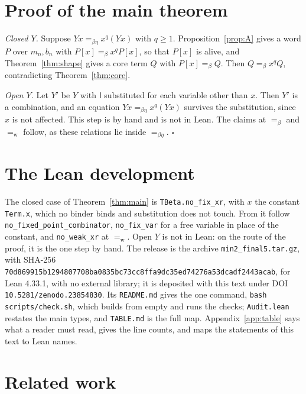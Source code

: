 \documentclass[a4paper,english]{lipics-v2021}
\newcommand{\I}{\mathsf{I}}
\newcommand{\eqw}{=_{\mathrm{w}}}
\newcommand{\eqb}{=_{\beta}}
\newcommand{\eqbe}{=_{\beta\eta}}
\newcommand{\lean}[1]{\texttt{#1}}
\begin{document}
\section{Proof of the main theorem}\label{sec:proof}

\emph{Closed $Y$.} Suppose $Yx \eqbe x^q(Yx)$ with $q \geq 1$. Proposition~\ref{prop:A} gives a word $P$ over $m_n,b_n$ with $P[x] \eqb x^qP[x]$, so that $P[x]$ is alive, and Theorem~\ref{thm:shape} gives a core term $Q$ with $P[x] \eqb Q$. Then $Q \eqb x^qQ$, contradicting Theorem~\ref{thm:core}.

\emph{Open $Y$.} Let $Y'$ be $Y$ with $\I$ substituted for each variable other than $x$. Then $Y'$ is a combination, and an equation $Yx \eqbe x^q(Yx)$ survives the substitution, since $x$ is not affected. This step is by hand and is not in Lean. The claims at $\eqb$ and $\eqw$ follow, as these relations lie inside $\eqbe$. \hfill$\square$

\section{The Lean development}\label{sec:lean}

The closed case of Theorem~\ref{thm:main} is \lean{TBeta.no\_fix\_xr}, with $x$ the constant \lean{Term.x}, which no binder binds and substitution does not touch. From it follow \lean{no\_fixed\_\allowbreak point\_\allowbreak combinator}, \lean{no\_fix\_var} for a free variable in place of the constant, and \lean{no\_weak\_xr} at $\eqw$. Open $Y$ is not in Lean: on the route of the proof, it is the one step by hand. The release is the archive \lean{min2\_final5.tar.gz}, with SHA-256\\ {\small\lean{70d869915b1294807708ba0835bc73cc8ffa9dc35ed74276a53dcadf2443acab}}, for Lean 4.33.1, with no external library; it is deposited with this text under DOI \lean{10.5281/zenodo.23854830}. Its \lean{README.md} gives the one command, \lean{bash scripts/check.sh}, which builds from empty and runs the checks; \lean{Audit.lean} restates the main types, and \lean{TABLE.md} is the full map. Appendix~\ref{app:table} says what a reader must read, gives the line counts, and maps the statements of this text to Lean names.

\section{Related work}\label{sec:related}
\end{document}
